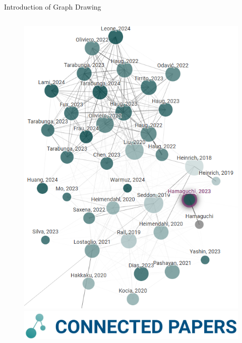 \documentclass[dvipdfmx,13pt,aspectratio=169]{beamer}
\begin{document}
\begin{frame}{Introduction of Graph Drawing}
\begin{columns}
\begin{column}{0.42\columnwidth}
\begin{figure}[htbp]
          \includegraphics[height=0.75\textheight]{introExample/connectedPapers.png}
          \includegraphics[height=0.1\textheight]{introExample/connectedPapersLogo.png}
        \end{figure}
      \end{column}
    \end{columns}
  \end{frame}
\fi
\end{document}
